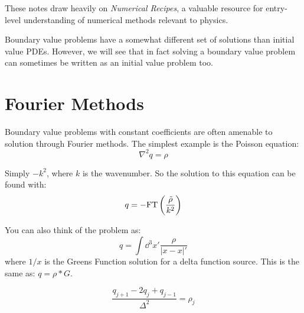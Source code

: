 These notes draw heavily on {\it Numerical Recipes}, a valuable
resource for entry-level understanding of numerical methods relevant
to physics.

Boundary value problems have a somewhat different set of solutions
than initial value PDEs. However, we will see that in fact solving a
boundary value problem can sometimes be written as an initial value
problem too.

\section{Fourier Methods}

Boundary value problems with constant coefficients are often amenable
to solution through Fourier methods. The simplest example is the
Poisson equation:
\begin{equation}
\nabla^2 q = \rho
\end{equation}


\begin{answer}
  Simply $-k^2$, where $k$ is the wavenumber. So the solution to this
  equation can be found with:
  \begin{equation}
    q = - {\rm FT}\left(\frac{\tilde\rho}{k^2}\right)
  \end{equation}
\end{answer}

You can also think of the problem as:
\begin{equation}
q = \int \dd{^3x}' \frac{\rho}{|x-x|'}
\end{equation}
where $1/x$ is the Greens Function solution for a delta function
source. This is the same as: $q = \rho \ast G$. 


\begin{answer}
\begin{equation}
\frac{q_{j+1} - 2 q_{j} + q_{j-1}}{\Delta^2} = \rho_j
\end{equation}
\end{answer}

